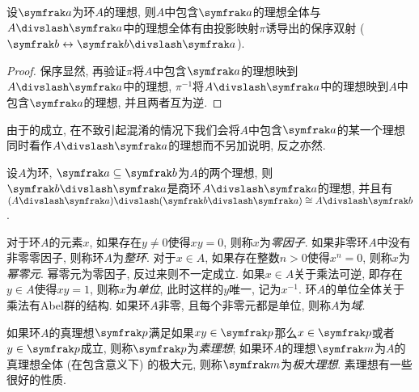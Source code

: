 \begin{proposition}\label{prop:quotidealcorr}
  设$\ideal{a}$为环$A$的理想, 则$A$中包含$\ideal{a}$的理想全体与$A{\divslash}\ideal{a}$中的理想全体有由投影映射$\pi$诱导出的保序双射 ($\ideal{b}\leftrightarrow\ideal{b}{\divslash}\ideal{a}$).
\end{proposition}

\begin{proof}
  保序显然, 再验证$\pi$将$A$中包含$\ideal{a}$的理想映到$A{\divslash}\ideal{a}$中的理想, $\pi^{-1}$将$A{\divslash}\ideal{a}$中的理想映到$A$中包含$\ideal{a}$的理想, 并且两者互为逆.
\end{proof}

\begin{remark}
  由于的成立, 在不致引起混淆的情况下我们会将$A$中包含$\ideal{a}$的某一个理想同时看作$A{\divslash}\ideal{a}$的理想而不另加说明, 反之亦然.
\end{remark}

\begin{propositionnoproof}\label{prop:thirdisomorphism}
  设$A$为环, $\ideal{a}\subseteq\ideal{b}$为$A$的两个理想, 则$\ideal{b}{\divslash}\ideal{a}$是商环$A{\divslash}\ideal{a}$的理想, 并且有$(A{\divslash}\ideal{a}){\divslash}(\ideal{b}{\divslash}\ideal{a})\cong A{\divslash}\ideal{b}$.
\end{propositionnoproof}

对于环$A$的元素$x$, 如果存在$y\neq 0$使得$xy=0$, 则称$x$为\emph{零因子}. 如果非零环$A$中没有非零零因子, 则称环$A$为\emph{整环}. 对于$x\in A$, 如果存在整数$n>0$使得$x^n = 0$, 则称$x$为\emph{幂零元}. 幂零元为零因子, 反过来则不一定成立. 如果$x\in A$关于乘法可逆, 即存在$y\in A$使得$xy=1$, 则称$x$为\emph{单位}, 此时这样的$y$唯一, 记为$x^{-1}$. 环$A$的单位全体关于乘法有Abel群的结构. 如果环$A$非零, 且每个非零元都是单位, 则称$A$为\emph{域}.

如果环$A$的真理想$\ideal{p}$满足如果$xy\in\ideal{p}$那么$x\in \ideal{p}$或者$y\in\ideal{p}$成立, 则称$\ideal{p}$为\emph{素理想}; 如果环$A$的理想$\ideal{m}$为$A$的真理想全体 (在包含意义下) 的极大元, 则称$\ideal{m}$为\emph{极大理想}. 素理想有一些很好的性质.

